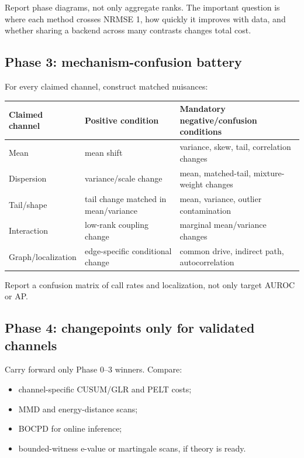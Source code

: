 \documentclass[10pt]{article}
\begin{document}
Report phase diagrams, not only aggregate ranks. The important question is where each method crosses NRMSE 1, how quickly it improves with data, and whether sharing a backend across many contrasts changes total cost.

\subsection{Phase 3: mechanism-confusion battery}

For every claimed channel, construct matched nuisances:

\begin{center}
\begin{tabular}{@{}lll@{}}
\toprule
Claimed channel & Positive condition & Mandatory negative/confusion conditions \\
\midrule
Mean & mean shift & variance, skew, tail, correlation changes \\
Dispersion & variance/scale change & mean, matched-tail, mixture-weight changes \\
Tail/shape & tail change matched in mean/variance & mean, variance, outlier contamination \\
Interaction & low-rank coupling change & marginal mean/variance changes \\
Graph/localization & edge-specific conditional change & common drive, indirect path, autocorrelation \\
\bottomrule
\end{tabular}
\end{center}

Report a confusion matrix of call rates and localization, not only target AUROC or AP.

\subsection{Phase 4: changepoints only for validated channels}

Carry forward only Phase 0--3 winners. Compare:

\begin{itemize}
  \item channel-specific CUSUM/GLR and PELT costs;
  \item MMD and energy-distance scans;
  \item BOCPD for online inference;
  \item bounded-witness e-value or martingale scans, if theory is ready.
\end{itemize}
\end{document}
